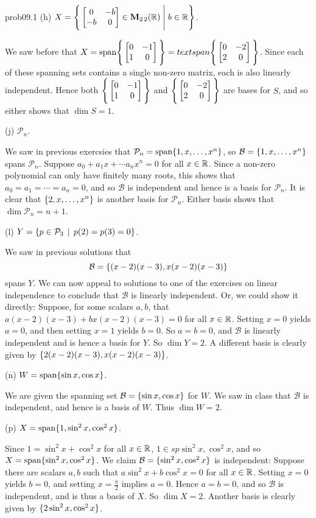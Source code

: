 \begin{sol}{prob09.1}
(h)  $X=\Bigg\{  \bmatrix 0&-b\\ -b&0\endbmatrix \in \M_{2 \,2}(\R) \;\Bigg|\; b \in \R\Bigg\}$.

\soln   We saw before that $X=\text{span}\Bigg\{ \bmatrix 0&-1\\ 1&0\endbmatrix\Bigg\}=text{span}\Bigg\{ \bmatrix 0&-2\\ 2&0\endbmatrix\Bigg\}$. Since each of these spanning sets contains a single non-zero matrix, each is also linearly independent. Hence both $\Bigg\{ \bmatrix 0&-1\\ 1&0\endbmatrix\Bigg\}$ and $\Bigg\{ \bmatrix 0&-2\\ 2&0\endbmatrix\Bigg\}$ are bases for $S$, and so either shows that $\dim S=1$. \medskip
%


(j)  $\mathcal P_n$.  

\soln We saw in previous exercsies that $ \mathcal P_n=\textrm{span}\{1,x,\dots , x^n\} $, so $\mathcal B=\{1,x,\dots , x^n \}$ spans $\mathcal P_n$. Suppose $a_0 + a_1 x +\cdots a_n x^n =0$ for all $x\in \mathbb{R}$. Since a non-zero polynomial can only have finitely many roots, this shows that $a_0=a_1=\cdots=a_n=0$, and so  $\mathcal B$ is independent and hence is a basis for $\mathcal P_n$. It is clear that $\{2,x,\dots , x^n \}$ is another basis for $\mathcal P_n$. Either basis shows that  $\dim \mathcal P_n=n+1$. \medskip
%

(l)  $Y= \{p \in \mathcal P_3 \,\mid \,  p(2)=p(3)=0 \}$. 

\soln We saw in previous solutions that $$\mathcal B= \{(x-2)(x-3), x(x-2)(x-3) \}$$ spans $Y$. We can now appeal to solutions to one of the exercises on linear independence to conclude that $\mathcal B$ is linearly independent. Or, we could show it directly: Suppose, for some scalars $a,b$, that  $a(x-2)(x-3)+b x(x-2)(x-3)=0$ for all $x\in \mathbb{R}$. Setting $x=0$ yields $a=0$, and then setting $x=1$ yields $b=0$. So $a=b=0$, and $\mathcal B$ is linearly independent and is hence a basis for $Y$. So $\dim Y=2$. A different basis is clearly given by  $\{2(x-2)(x-3), x(x-2)(x-3) \}$. \medskip
%


(n)  $ W=\textrm{span}\{\sin x, \cos x\}$.   

\soln We are given the spanning set $\mathcal B=\{\sin x, \cos x \}$ for $W$. We saw in class that $\mathcal B$ is independent, and hence is a basis of $W$. Thus $\dim W=2$.   \medskip

(p)  $X=\textrm{span}\{1, \sin^2 x, \cos^2 x\}$.   

\soln Since $1=\sin^2 x+ \cos^2 x $ for all $x\in \mathbb{R}$, $1\in sp{\sin^2 x, \cos^2 x}$, and so $X=\textrm{span}\{\sin^2 x, \cos^2 x\}$. We claim $\mathcal B=\{\sin^2 x, \cos^2 x \}$ is independent: Suppose there are scalars $a,b$ such that $a\sin^2 x + b \cos^2 x=0$ for all $x\in \mathbb{R}$. Setting $x=0$ yields $b=0$, and setting $x=\frac{\pi}{2}$ implies $a=0$. Hence $a=b=0$, and so   $\mathcal B$ is independent, and is thus a basis of $X$. So $\dim X=2$. Another basis is clearly given by $\{2\sin^2 x, \cos^2 x \}$.  \medskip
%


\end{sol}

